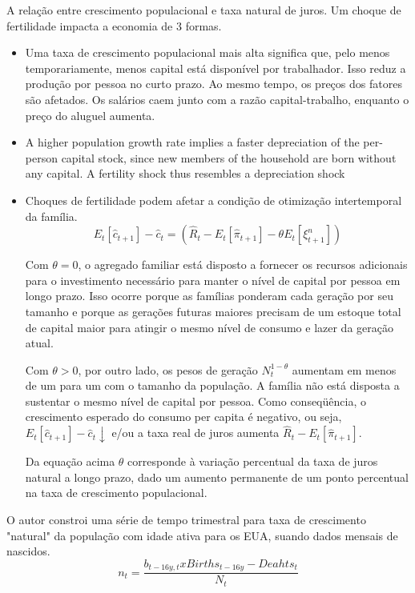 A relação entre crescimento populacional e taxa natural de juros. Um choque de fertilidade impacta a economia de 3 formas.
\begin{itemize}
    \item Uma taxa de crescimento populacional mais alta significa que, pelo menos temporariamente, menos capital está disponível por trabalhador. Isso reduz a produção por pessoa no curto prazo. Ao mesmo tempo, os preços dos fatores são afetados. Os salários caem junto com a razão capital-trabalho, enquanto o preço do aluguel aumenta.
    
    \item A higher population growth rate implies a faster depreciation of the per-person capital stock, since new members of the household are born without any capital. A fertility shock thus resembles a depreciation shock
    
    \item Choques de fertilidade podem afetar a condição de otimização intertemporal da família.
    $$E_t[\hat{c}_{t+1}] - \hat{c}_{t} = \left(\hat{R}_t - E_t[\hat{\pi}_{t+1}]  - \theta E_t[\xi_{t+1}^{n}] \right)$$
    
    Com $\theta = 0$, o agregado familiar está disposto a fornecer os recursos adicionais para o investimento necessário para manter o nível de capital por pessoa em longo prazo. Isso ocorre porque as famílias ponderam cada geração por seu tamanho e porque as gerações futuras maiores precisam de um estoque total de capital maior para atingir o mesmo nível de consumo e lazer da geração atual.
    
    Com $\theta > 0$, por outro lado, os pesos de geração $N_t^{1-\theta}$ aumentam em menos de um para um com o tamanho da população. A família não está disposta a sustentar o mesmo nível de capital por pessoa. Como conseqüência, o crescimento esperado do consumo per capita é negativo, ou seja, $E_t[\hat{c}_{t+1}] - \hat{c}_{t} \downarrow$ e/ou a taxa real de juros aumenta $\hat{R}_t - E_t[\hat{\pi}_{t+1}]$.
    
    Da equação acima $\theta $ corresponde à variação percentual da taxa de juros natural a longo prazo, dado um aumento permanente de um ponto percentual na taxa de crescimento populacional.
    
\end{itemize}

O autor constroi uma série de tempo trimestral para taxa de crescimento "natural" da população com idade ativa para os EUA, suando dados mensais de nascidos. 
$$n_t = \dfrac{b_{t-16y,t} x Births_{t-16y} - Deahts_t}{N_t} $$

